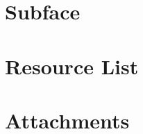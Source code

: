\documentclass[paper=a4, fontsize=11pt,twoside]{scrartcl}	%
\begin{document}
\section{Subface}
\newpage

\section{Resource List}


\newpage

\section{Attachments}




\end{document}
